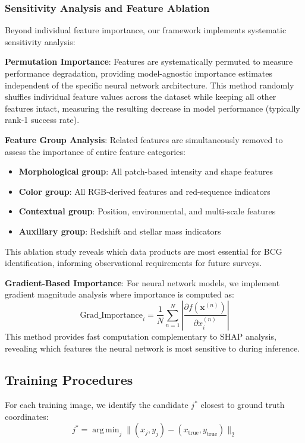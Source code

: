 \documentclass[twocolumn,10pt]{aastex631}
\DeclareMathOperator*{\argmin}{arg\,min}
\begin{document}
\subsubsection{Sensitivity Analysis and Feature Ablation}

Beyond individual feature importance, our framework implements systematic sensitivity analysis:

\textbf{Permutation Importance}: Features are systematically permuted to measure performance degradation, providing model-agnostic importance estimates independent of the specific neural network architecture. This method randomly shuffles individual feature values across the dataset while keeping all other features intact, measuring the resulting decrease in model performance (typically rank-1 success rate).

\textbf{Feature Group Analysis}: Related features are simultaneously removed to assess the importance of entire feature categories:
\begin{itemize}
\item \textbf{Morphological group}: All patch-based intensity and shape features
\item \textbf{Color group}: All RGB-derived features and red-sequence indicators
\item \textbf{Contextual group}: Position, environmental, and multi-scale features
\item \textbf{Auxiliary group}: Redshift and stellar mass indicators
\end{itemize}
This ablation study reveals which data products are most essential for BCG identification, informing observational requirements for future surveys.

\textbf{Gradient-Based Importance}: For neural network models, we implement gradient magnitude analysis where importance is computed as:
\begin{equation}
\text{Grad\_Importance}_i = \frac{1}{N} \sum_{n=1}^{N} \left|\frac{\partial f(\mathbf{x}^{(n)})}{\partial x_i^{(n)}}\right|
\end{equation}
This method provides fast computation complementary to SHAP analysis, revealing which features the neural network is most sensitive to during inference.

\subsection{Training Procedures}

For each training image, we identify the candidate $j^*$ closest to ground truth coordinates:
\begin{equation}
j^* = \argmin_j \|(x_j, y_j) - (x_{\text{true}}, y_{\text{true}})\|_2
\end{equation}
\end{document}
